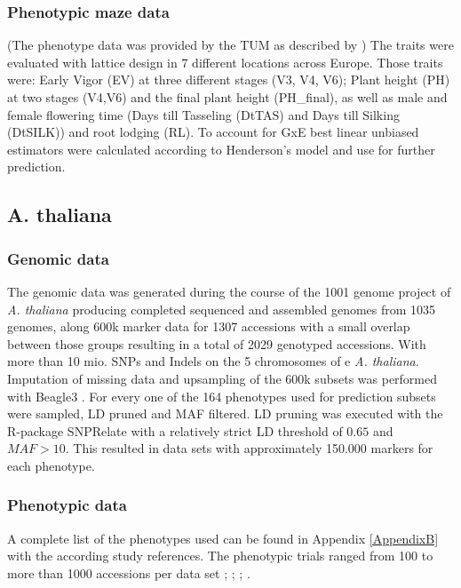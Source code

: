 \subsubsection{Phenotypic maze data}
(The phenotype data was provided by the TUM as described by \cite{holker2019european}) \newline The traits
were evaluated with lattice design in 7 different locations across Europe.  Those traits were: Early Vigor
(EV) at three different stages (V3, V4, V6); Plant height (PH) at two stages (V4,V6) and the final plant
height (PH\_final), as well as male and female flowering time (Days till Tasseling (DtTAS) and Days till
Silking (DtSILK)) and root lodging (RL).  To account for GxE best linear unbiased estimators were calculated
according to Henderson's model \cite{henderson1975best} and use for further prediction.


\subsection{A. thaliana}

\subsubsection{Genomic data}

The genomic data was generated during the course of the 1001 genome project of \textit{A. thaliana}
\cite{1001genome} producing completed sequenced and assembled genomes from 1035 genomes, along 600k marker
data for 1307 accessions with a small overlap between those groups resulting in a total of 2029 genotyped
accessions. With more than 10 mio. SNPs and Indels on the 5 chromosomes of e \textit{A. thaliana}. Imputation
of missing data and upsampling of the 600k subsets was performed with Beagle3 \cite{browning2007rapid}.  For
every one of the 164 phenotypes used for prediction subsets were sampled, LD pruned and MAF filtered. LD
pruning was executed with the R-package SNPRelate \cite{zheng2013tutorial} with a relatively strict LD
threshold of $0.65$ and $MAF > 10 $. This resulted in data sets with approximately 150.000 markers for each
phenotype.

\subsubsection{Phenotypic data}
A complete list of the phenotypes used can be found in Appendix \ref{AppendixB} with the according study
references.  The phenotypic trials ranged from 100 to more than 1000 accessions per data set \cite{atwell2010}; \cite{li2010}; \cite{strauch2015}; \cite{me2014}.


